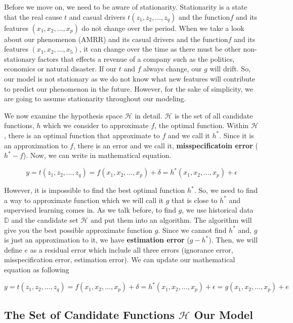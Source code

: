 \documentclass[12pt]{article}
\begin{document}
Before we move on, we need to be aware of stationarity. Stationarity is a state that the real cause $t$ and casual drivers $t(z_1, z_2, \dots, z_q)$ and the function$f$ and its features $(x_1, x_2, \dots, x_p)$ do not change over the period. When we take a look about our phenomenon (AMRR) and its casual drivers and the function$f$ and its features $(x_1, x_2, \dots, x_5)$, it can change over the time as there must be other non-stationary factors that effects a revenue of a company such as the politics, economics or natural disaster. If our $t$ and $f$ always change, our $g$ will drift. So, our model is not stationary as we do not know what new features will contribute to predict our phenomenon in the future. However, for the sake of simplicity, we are going to assume stationarity throughout our modeling. 

We now examine the hypothesis space $\mathcal{H}$ in detail. $\mathcal{H}$ is the set of all candidate functions, $h$ which we consider to approximate $f$, the optimal function. Within $\mathcal{H}$, there is an optimal function that approximate to $f$ and we call it $h^*$. Since it is an approximation to $f$, there is an error and we call it, \textbf{misspecificatoin error} ($h^* - f$). Now, we can write in mathematical equation.

\[
y = t(z_1, z_2, \dots, z_q) = f(x_1, x_2, \dots, x_p) + \delta = h^*(x_1, x_2, \dots, x_p) + \epsilon
\]

However, it is impossible to find the best optimal function $h^*$. So, we need to find a way to approximate function which we will call it $g$ that is close to $h^*$ and supervised learning comes in. As we talk before, to find $g$, we use historical data $\mathbb{D}$ and the candidate set $\mathcal{H}$ and put them into an algorithm. The algorithm will give you the best possible approximate function $g$. Since we cannot find $h^*$ and, $g$ is just an approximation to it, we have \textbf{estimation error} ($g-h^*$). Then, we will define $e$ as a residual error which include all three errors (ignorance error, misspecification error, estimation error). We can update our mathematical equation as following

\[
y = t(z_1, z_2, \dots, z_q) = f(x_1, x_2, \dots, x_p) + \delta = h^*(x_1, x_2, \dots, x_p) + \epsilon = g(x_1, x_2, \dots, x_p) + e
\]

\subsection{The Set of Candidate Functions $\mathcal{H}$ Our Model} 
\end{document}
